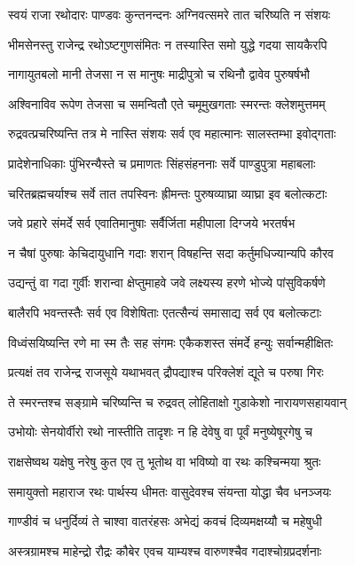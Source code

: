 \twolineshloka
{स्वयं राजा रथोदारः पाण्डवः कुन्तनन्दनः}
{अग्निवत्समरे तात चरिष्यति न संशयः}


\twolineshloka
{भीमसेनस्तु राजेन्द्र रथोऽष्टगुणसंमितः}
{न तस्यास्ति समो युद्धे गदया सायकैरपि}


\twolineshloka
{नागायुतबलो मानी तेजसा न स मानुषः}
{माद्रीपुत्रो च रथिनौ द्वावेव पुरुषर्षभौ}


\twolineshloka
{अश्विनाविव रूपेण तेजसा च समन्वितौ}
{एते चमूमुखगताः स्मरन्तः क्लेशमुत्तमम्}


\twolineshloka
{रुद्रवत्प्रचरिष्यन्ति तत्र मे नास्ति संशयः}
{सर्व एव महात्मानः सालस्तम्भा इवोद्गताः}


\twolineshloka
{प्रादेशेनाधिकाः पुंभिरन्यैस्ते च प्रमाणतः}
{सिंहसंहननाः सर्वे पाण्डुपुत्रा महाबलाः}


\twolineshloka
{चरितब्रह्मचर्याश्च सर्वे तात तपस्विनः}
{ह्रीमन्तः पुरुषव्याघ्रा व्याघ्रा इव बलोत्कटाः}


\twolineshloka
{जवे प्रहारे संमर्दे सर्व एवातिमानुषाः}
{सर्वैर्जिता महीपाला दिग्जये भरतर्षभ}


\twolineshloka
{न चैषां पुरुषाः केचिदायुधानि गदाः शरान्}
{विषहन्ति सदा कर्तुमधिज्यान्यपि कौरव}


\twolineshloka
{उद्यन्तुं वा गदा गुर्वीः शरान्वा क्षेप्तुमाहवे}
{जवे लक्ष्यस्य हरणे भोज्ये पांसुविकर्षणे}


\twolineshloka
{बालैरपि भवन्तस्तैः सर्व एव विशेषिताः}
{एतत्सैन्यं समासाद्य सर्व एव बलोत्कटाः}


\twolineshloka
{विध्वंसयिष्यन्ति रणे मा स्म तैः सह संगमः}
{एकैकशस्त संमर्दे हन्युः सर्वान्महीक्षितः}


\twolineshloka
{प्रत्यक्षं तव राजेन्द्र राजसूये यथाभवत्}
{द्रौपद्याश्च परिक्लेशं द्यूते च परुषा गिरः}


\twolineshloka
{ते स्मरन्तश्च सङ्ग्रामे चरिष्यन्ति च रुद्रवत्}
{लोहिताक्षो गुडाकेशो नारायणसहायवान्}


\twolineshloka
{उभोयोः सेनयोर्वीरो रथो नास्तीति तादृशः}
{न हि देवेषु वा पूर्वं मनुष्येषूरगेषु च}


\twolineshloka
{राक्षसेष्वथ यक्षेषु नरेषु कुत एव तु}
{भूतोथ वा भविष्यो वा रथः कश्चिन्मया श्रुतः}


\twolineshloka
{समायुक्तो महाराज रथः पार्थस्य धीमतः}
{वासुदेवश्च संयन्ता योद्धा चैव धनञ्जयः}


\twolineshloka
{गाण्डीवं च धनुर्दिव्यं ते चाश्वा वातरंहसः}
{अभेद्यं कवचं दिव्यमक्षय्यौ च महेषुधी}


\twolineshloka
{अस्त्रग्रामश्च माहेन्द्रो रौद्रः कौबेर एवच}
{याम्यश्च वारुणश्चैव गदाश्चोग्रप्रदर्शनाः}


